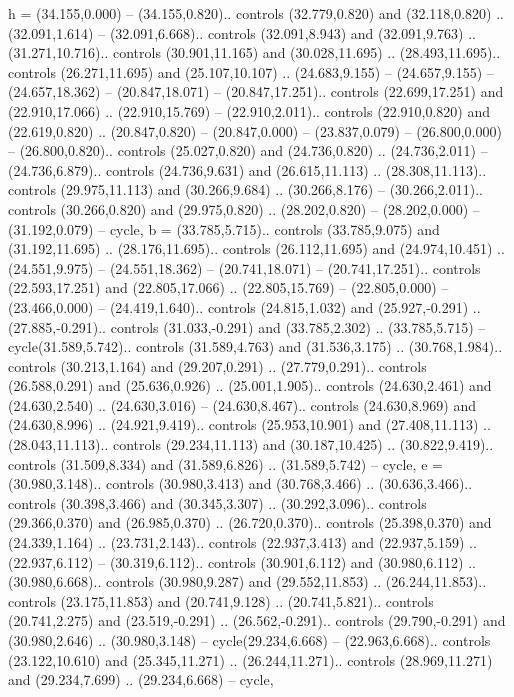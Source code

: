 {h} = {(34.155,0.000) -- (34.155,0.820).. controls (32.779,0.820) and (32.118,0.820) .. (32.091,1.614) -- (32.091,6.668).. controls (32.091,8.943) and (32.091,9.763) .. (31.271,10.716).. controls (30.901,11.165) and (30.028,11.695) .. (28.493,11.695).. controls (26.271,11.695) and (25.107,10.107) .. (24.683,9.155) -- (24.657,9.155) -- (24.657,18.362) -- (20.847,18.071) -- (20.847,17.251).. controls (22.699,17.251) and (22.910,17.066) .. (22.910,15.769) -- (22.910,2.011).. controls (22.910,0.820) and (22.619,0.820) .. (20.847,0.820) -- (20.847,0.000) -- (23.837,0.079) -- (26.800,0.000) -- (26.800,0.820).. controls (25.027,0.820) and (24.736,0.820) .. (24.736,2.011) -- (24.736,6.879).. controls (24.736,9.631) and (26.615,11.113) .. (28.308,11.113).. controls (29.975,11.113) and (30.266,9.684) .. (30.266,8.176) -- (30.266,2.011).. controls (30.266,0.820) and (29.975,0.820) .. (28.202,0.820) -- (28.202,0.000) -- (31.192,0.079) -- cycle},
{b} = {(33.785,5.715).. controls (33.785,9.075) and (31.192,11.695) .. (28.176,11.695).. controls (26.112,11.695) and (24.974,10.451) .. (24.551,9.975) -- (24.551,18.362) -- (20.741,18.071) -- (20.741,17.251).. controls (22.593,17.251) and (22.805,17.066) .. (22.805,15.769) -- (22.805,0.000) -- (23.466,0.000) -- (24.419,1.640).. controls (24.815,1.032) and (25.927,-0.291) .. (27.885,-0.291).. controls (31.033,-0.291) and (33.785,2.302) .. (33.785,5.715) -- cycle(31.589,5.742).. controls (31.589,4.763) and (31.536,3.175) .. (30.768,1.984).. controls (30.213,1.164) and (29.207,0.291) .. (27.779,0.291).. controls (26.588,0.291) and (25.636,0.926) .. (25.001,1.905).. controls (24.630,2.461) and (24.630,2.540) .. (24.630,3.016) -- (24.630,8.467).. controls (24.630,8.969) and (24.630,8.996) .. (24.921,9.419).. controls (25.953,10.901) and (27.408,11.113) .. (28.043,11.113).. controls (29.234,11.113) and (30.187,10.425) .. (30.822,9.419).. controls (31.509,8.334) and (31.589,6.826) .. (31.589,5.742) -- cycle},
{e} = {(30.980,3.148).. controls (30.980,3.413) and (30.768,3.466) .. (30.636,3.466).. controls (30.398,3.466) and (30.345,3.307) .. (30.292,3.096).. controls (29.366,0.370) and (26.985,0.370) .. (26.720,0.370).. controls (25.398,0.370) and (24.339,1.164) .. (23.731,2.143).. controls (22.937,3.413) and (22.937,5.159) .. (22.937,6.112) -- (30.319,6.112).. controls (30.901,6.112) and (30.980,6.112) .. (30.980,6.668).. controls (30.980,9.287) and (29.552,11.853) .. (26.244,11.853).. controls (23.175,11.853) and (20.741,9.128) .. (20.741,5.821).. controls (20.741,2.275) and (23.519,-0.291) .. (26.562,-0.291).. controls (29.790,-0.291) and (30.980,2.646) .. (30.980,3.148) -- cycle(29.234,6.668) -- (22.963,6.668).. controls (23.122,10.610) and (25.345,11.271) .. (26.244,11.271).. controls (28.969,11.271) and (29.234,7.699) .. (29.234,6.668) -- cycle},
